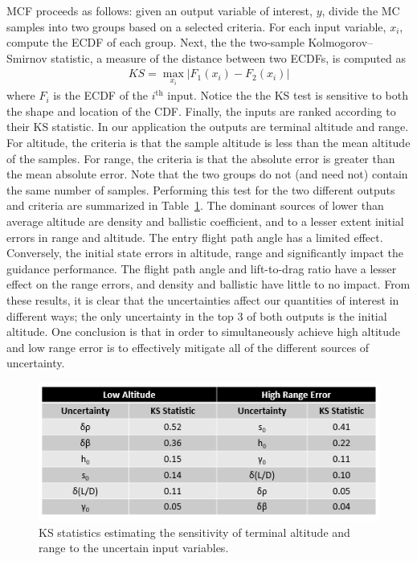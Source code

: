 MCF proceeds as follows: given an output variable of interest, $y$, divide the MC samples into two groups based on a selected criteria. For each input variable, $x_i$, compute the ECDF of each group. Next, the the two-sample Kolmogorov–Smirnov statistic, a measure of the distance between two ECDFs, is computed as
 \begin{align}
	KS = \max_{x_i} | F_1(x_i) - F_2(x_i) | \label{Eq:KSTest}
\end{align}
where $F_i$ is the ECDF of the $i^{\mathrm{th}}$ input. Notice the the KS test is sensitive to both the shape and location of the CDF. Finally, the inputs are ranked according to their KS statistic. In our application the outputs are terminal altitude and range. For altitude, the criteria is that the sample altitude is less than the mean altitude of the samples. For range, the criteria is that the absolute error is greater than the mean absolute error. Note that the two groups do not (and need not) contain the same number of samples. Performing this test for the two different outputs and criteria are summarized in Table~\ref{Table:MCF}. The dominant sources of lower than average altitude are density and ballistic coefficient, and to a lesser extent initial errors in range and altitude. The entry flight path angle has a limited effect. Conversely, the initial state errors in altitude, range and significantly impact the guidance performance. The flight path angle and lift-to-drag ratio have a lesser effect on the range errors, and density and ballistic have little to no impact. From these results, it is clear that the uncertainties affect our quantities of interest in different ways; the only uncertainty in the top 3 of both outputs is the initial altitude. One conclusion is that in order to simultaneously achieve high altitude and low range error is to effectively mitigate all of the different sources of uncertainty. 
\begin{figure}[h!]
	\centering
	\includegraphics[width=1\textwidth]{Images/MCFTable}
	\caption{KS statistics estimating the sensitivity of terminal altitude and range to the uncertain input variables.}
	\label{Table:MCF}
\end{figure}

